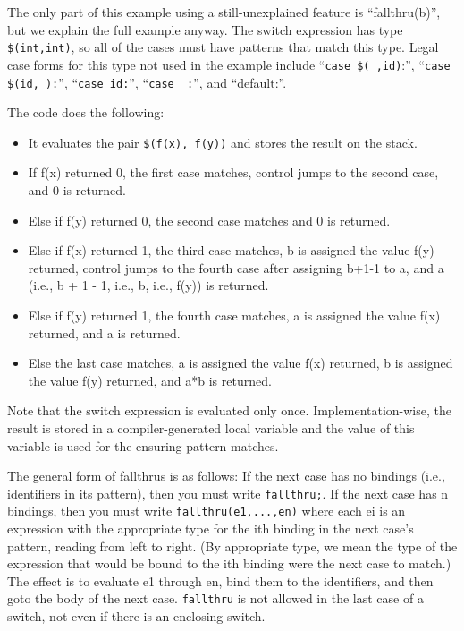 The only part of this example using a still-unexplained feature is
``fallthru(b)'', but we explain the full example anyway.  The switch
expression has type \texttt{\$(int,int)}, so all of the cases must
have patterns that match this type.  Legal case forms for this type
not used in the example include ``\texttt{case \$(_,id)}:'',
``\texttt{case \$(id,_):}'',
``\texttt{case id:}'',
``\texttt{case _:}'',
and
``default:''.

The code does the following:

\begin{itemize}
\item It evaluates the pair \texttt{\$(f(x), f(y))} and stores the
  result on the stack.
\item If f(x) returned 0, the first case matches, control jumps to the second
  case, and 0 is returned. 
\item Else if f(y) returned 0, the second case matches and 0 is returned.  
\item Else if f(x) returned 1, the third case matches, b is assigned the value
  f(y) returned, control jumps to the fourth case after assigning b+1-1 to a,
  and a (i.e., b + 1 - 1, i.e., b, i.e., f(y)) is returned.
\item Else if f(y) returned 1, the fourth case matches, a is assigned the value
  f(x) returned, and a is returned.
\item Else the last case matches, a is assigned the value f(x) returned, b is
  assigned the value f(y) returned, and a*b is returned.
\end{itemize}

Note that the switch expression is evaluated only once.
Implementation-wise, the result is stored in a compiler-generated
local variable and the value of this variable is used for the ensuring
pattern matches.

The general form of fallthrus is as follows: If the next case has no
bindings (i.e., identifiers in its pattern), then you must write
\texttt{fallthru;}.  If the next case has n bindings, then you must
write \texttt{fallthru(e1,...,en)} where each ei is an expression with
the appropriate type for the ith binding in the next case's pattern,
reading from left to right.  (By appropriate type, we mean the type of
the expression that would be bound to the ith binding were the next
case to match.)  The effect is to evaluate e1 through en, bind them to
the identifiers, and then goto the body of the next case.
\texttt{fallthru} is not allowed in the last case of a switch, not
even if there is an enclosing switch.

